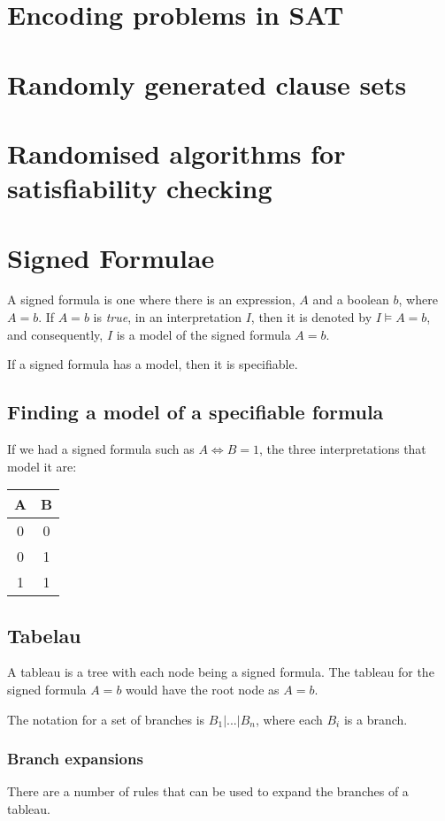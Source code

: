 \section{Encoding problems in SAT}

\section{Randomly generated clause sets}

\section{Randomised algorithms for satisfiability checking}

\section{Signed Formulae}

A signed formula is one where there is an expression, $A$ and a boolean $b$,
where $A = b$. If $A = b$ is {\it true}, in an interpretation $I$, then it is
denoted by $I \models A = b$, and consequently, $I$ is a model of the signed
formula $A = b$.


If a signed formula has a model, then it is specifiable.

\subsection{Finding a model of a specifiable formula}

If we had a signed formula such as $A \Leftrightarrow B = 1$, the three
interpretations that model it are:

\begin{center}
    \begin{tabular}{cc}
        A & B\\ \hline
        0 & 0\\
        0 & 1\\
        1 & 1\\
    \end{tabular}
\end{center}

\subsection{Tabelau}

A tableau is a tree with each node being a signed formula. The tableau for the
signed formula $A = b$ would have the root node as $A = b$.

The notation for a set of branches is $B_1 | ... | B_n$, where each $B_i$ is a
branch.

\subsubsection{Branch expansions}

There are a number of rules that can be used to expand the branches of a
tableau.
